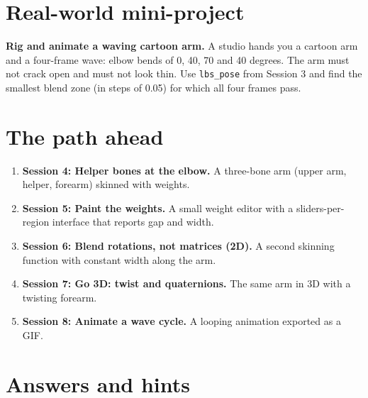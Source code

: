 \documentclass[11pt,a4paper]{article}
\begin{document}
\section{Real-world mini-project}
\textbf{Rig and animate a waving cartoon arm.} A studio hands you a cartoon arm and a four-frame wave: elbow bends of 0, 40, 70 and 40 degrees. The arm must not crack open and must not look thin. Use \texttt{lbs\_pose} from Session 3 and find the smallest blend zone (in steps of 0.05) for which all four frames pass.

\section{The path ahead}
\begin{enumerate}[nosep]
\item \textbf{Session 4: Helper bones at the elbow.} A three-bone arm (upper arm, helper, forearm) skinned with weights.
\item \textbf{Session 5: Paint the weights.} A small weight editor with a sliders-per-region interface that reports gap and width.
\item \textbf{Session 6: Blend rotations, not matrices (2D).} A second skinning function with constant width along the arm.
\item \textbf{Session 7: Go 3D: twist and quaternions.} The same arm in 3D with a twisting forearm.
\item \textbf{Session 8: Animate a wave cycle.} A looping animation exported as a GIF.
\end{enumerate}

\section{Answers and hints}
\end{document}
